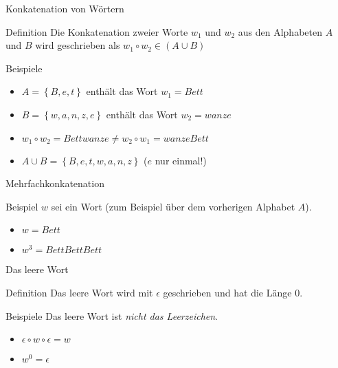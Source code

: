 \begin{frame}{Konkatenation von Wörtern}
    \begin{block}{Definition}
        Die Konkatenation zweier Worte $w_1$ und $w_2$ aus den Alphabeten $A$ und $B$ wird geschrieben als $w_1 \circ w_2 \in \left( A \cup B\right)$    
    \end{block}
    \begin{exampleblock}{Beispiele}
        \begin{itemize}
            \item $A = \left\{B, e, t\right\}$  enthält das Wort $w_1 = Bett$\\
            \item $B = \left\{w, a, n, z, e\right\}$ enthält das Wort $w_2 = wanze$\\
                \pause
            \item $w_1 \circ w_2 = Bettwanze \neq w_2 \circ w_1 = wanzeBett$
                \pause
            \item $A \cup B = \left\{B, e, t, w, a, n, z\right\}$ ($e$ nur einmal!)
        \end{itemize}
    \end{exampleblock}
\end{frame}

\begin{frame}{Mehrfachkonkatenation}
    \begin{exampleblock}{Beispiel}
        $w$ sei ein Wort (zum Beispiel über dem vorherigen Alphabet $A$).
        \begin{itemize}
            \item $w = Bett$
            \item $w^3 = BettBettBett$
        \end{itemize}
    \end{exampleblock}
\end{frame}

\begin{frame}{Das leere Wort}
    \begin{block}{Definition}
        Das leere Wort wird mit $\epsilon$ geschrieben und hat die Länge $0$.
    \end{block}
    \begin{exampleblock}{Beispiele}
        Das leere Wort ist \emph{nicht das Leerzeichen}. 
        \begin{itemize}
            \item $\epsilon \circ w \circ \epsilon = w$
            \item $w^0 = \epsilon$
        \end{itemize}
    \end{exampleblock}
\end{frame}

